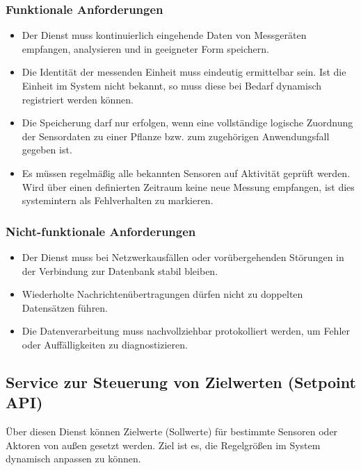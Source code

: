 \subsubsection{Funktionale Anforderungen}
\begin{itemize}
  \item Der Dienst muss kontinuierlich eingehende Daten von Messgeräten empfangen, analysieren und in geeigneter Form speichern.
  \item Die Identität der messenden Einheit muss eindeutig ermittelbar sein. Ist die Einheit im System nicht bekannt, so muss diese bei Bedarf dynamisch registriert werden können.
  \item Die Speicherung darf nur erfolgen, wenn eine vollständige logische Zuordnung der Sensordaten zu einer Pflanze bzw. zum zugehörigen Anwendungsfall gegeben ist.
  \item Es müssen regelmäßig alle bekannten Sensoren auf Aktivität geprüft werden. Wird über einen definierten Zeitraum keine neue Messung empfangen, ist dies systemintern als Fehlverhalten zu markieren.
\end{itemize}

\subsubsection{Nicht-funktionale Anforderungen}
\begin{itemize}
  \item Der Dienst muss bei Netzwerkausfällen oder vorübergehenden Störungen in der Verbindung zur Datenbank stabil bleiben.
  \item Wiederholte Nachrichtenübertragungen dürfen nicht zu doppelten Datensätzen führen.
  \item Die Datenverarbeitung muss nachvollziehbar protokolliert werden, um Fehler oder Auffälligkeiten zu diagnostizieren.
\end{itemize}

\subsection{Service zur Steuerung von Zielwerten (Setpoint API)}

Über diesen Dienst können Zielwerte (Sollwerte) für bestimmte Sensoren oder Aktoren von außen gesetzt werden. Ziel ist es, die Regelgrößen im System dynamisch anpassen zu können.

